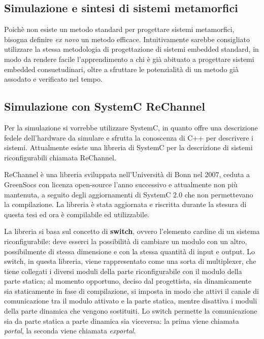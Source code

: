 \documentclass[a4paper,titlepage]{book}
\begin{document}
\subsection{Simulazione e sintesi di sistemi metamorfici}

Poichè non esiste un metodo standard per progettare sistemi metamorfici, bisogna definire \textit{ex novo} un metodo efficace. Intuitivamente sarebbe consigliato utilizzare la stessa metodologia di progettazione di sistemi embedded standard, in modo da rendere facile l'apprendimento a chi è già abituato a progettare sistemi embedded consuetudinari, oltre a sfruttare le potenzialità di un metodo già assodato e verificato nel tempo.

\subsection{Simulazione con SystemC ReChannel}

Per la simulazione si vorrebbe utilizzare SystemC, in quanto offre una descrizione fedele dell'hardware da simulare e sfrutta la conoscenza di C++ per descrivere i sistemi. Attualmente esiste una libreria di SystemC per la descrizione di sistemi riconfigurabili chiamata ReChannel.

ReChannel è una libreria sviluppata nell'Università di Bonn nel 2007, ceduta a GreenSocs con licenza open-source l'anno successivo e attualmente non più mantenuta, a seguito degli aggiornamenti di SystemC 2.0 che non permettevano la compilazione. La libreria è stata aggiornata e riscritta durante la stesura di questa tesi ed ora è compilabile ed utilizzabile.

La libreria si basa sul concetto di \textbf{switch}, ovvero l'elemento cardine di un sistema riconfigurabile: deve esserci la possibilità di cambiare un modulo con un altro, possibilmente di stessa dimensione e con la stessa quantità di input e output. Lo switch, in questa libreria, viene rappresentato come una sorta di multiplexer, che tiene collegati i diversi moduli della parte riconfigurabile con il modulo della parte statica; al momento opportuno, deciso dal progettista, sia dinamicamente sia staticamente in fase di compilazione, si imposta in modo che attivi il canale di comunicazione tra il modulo attivato e la parte statica, mentre disattiva i moduli della parte dinamica che vengono sostituiti. Lo switch permette la comunicazione sia da parte statica a parte dinamica sia viceversa: la prima viene chiamata \textit{portal}, la seconda viene chiamata \textit{exportal}.
\end{document}
